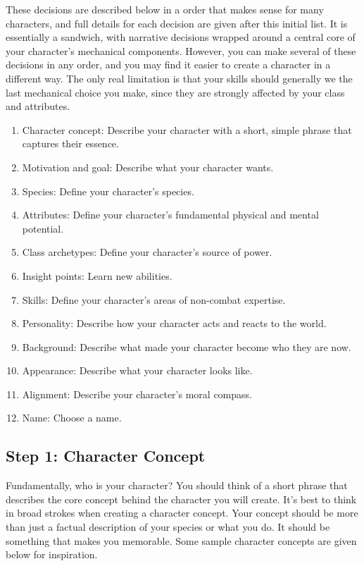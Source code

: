     These decisions are described below in a order that makes sense for many characters, and full details for each decision are given after this initial list.
    It is essentially a sandwich, with narrative decisions wrapped around a central core of your character's mechanical components.
    However, you can make several of these decisions in any order, and you may find it easier to create a character in a different way.
    The only real limitation is that your skills should generally we the last mechanical choice you make, since they are strongly affected by your class and attributes.

    \begin{enumerate}
        \item Character concept: Describe your character with a short, simple phrase that captures their essence.
        \item Motivation and goal: Describe what your character wants.

        \item Species: Define your character's species.
        \item Attributes: Define your character's fundamental physical and mental potential.
        \item Class archetypes: Define your character's source of power.
        \item Insight points: Learn new abilities.
        \item Skills: Define your character's areas of non-combat expertise.

        \item Personality: Describe how your character acts and reacts to the world.
        \item Background: Describe what made your character become who they are now.
        \item Appearance: Describe what your character looks like.
        \item Alignment: Describe your character's moral compass.
        \item Name: Choose a name.
    \end{enumerate}

    \subsection{Step 1: Character Concept}

        Fundamentally, who is your character?
        You should think of a short phrase that describes the core concept behind the character you will create.
        It's best to think in broad strokes when creating a character concept.
        Your concept should be more than just a factual description of your species or what you do.
        It should be something that makes you memorable.
        Some sample character concepts are given below for inspiration.

